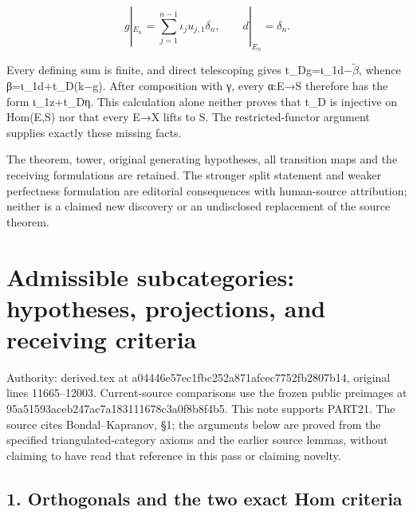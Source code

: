 \documentclass[11pt]{article}
\begin{document}
\[
 g|_{E_n}=\sum_{j=1}^{n-1}\iota_ju_{j,1}\delta_n,\qquad
 d|_{E_n}=\delta_n.
\]

Every defining sum is finite,\allowbreak{} and direct telescoping gives t\_\allowbreak{}Dg\allowbreak{}=ι\_\allowbreak{}1d−\(\widetilde\beta\),\allowbreak{} whence β\allowbreak{}=ι\_\allowbreak{}1d\allowbreak{}+t\_\allowbreak{}D(k−g)\allowbreak{}. After composition with γ,\allowbreak{} every α:\allowbreak{}E\allowbreak{}→S therefore has the form ι\_\allowbreak{}1z\allowbreak{}+t\_\allowbreak{}Dη. This calculation alone neither proves that t\_\allowbreak{}D is injective on Hom(E,\allowbreak{}S)\allowbreak{} nor that every E\allowbreak{}→X lifts to S. The restricted-functor argument supplies exactly these missing facts.

The theorem,\allowbreak{} tower,\allowbreak{} original generating hypotheses,\allowbreak{} all transition maps and the receiving formulations are retained. The stronger split statement and weaker perfectness formulation are editorial consequences with human-source attribution; neither is a claimed new discovery or an undisclosed replacement of the source theorem.
\clearpage
\section{\texorpdfstring{Admissible subcategories:\allowbreak{} hypotheses,\allowbreak{} projections,\allowbreak{} and receiving criteria}{Admissible    and receiving criteria}}\label{proofs-11665-12003-admissible-subcategories-hypotheses-projections-and-receiving-criteria}

Authority:\allowbreak{} derived.tex at a04446e5\allowbreak{}7ec1fbc2\allowbreak{}52a871af\allowbreak{}cec7752f\allowbreak{}b2807b14, original lines 11665–\allowbreak{}12003. Current-source comparisons use the frozen public preimages at 95a51593\allowbreak{}aceb247a\allowbreak{}c7a18311\allowbreak{}1678c3a0\allowbreak{}f8b8f4b5. This note supports PART21. The source cites Bondal–\allowbreak{}Kapranov,\allowbreak{} §1; the arguments below are proved from the specified triangulated-category axioms and the earlier source lemmas,\allowbreak{} without claiming to have read that reference in this pass or claiming novelty.

\subsection{1. Orthogonals and the two exact Hom criteria}\label{proofs-11665-12003-orthogonals-and-the-two-exact-hom-criteria}
\end{document}
